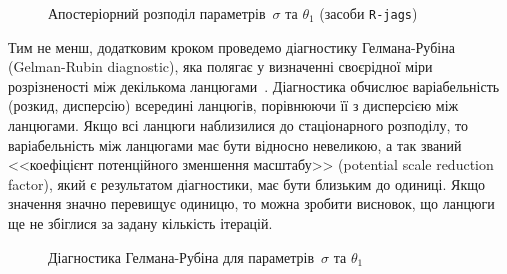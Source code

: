 \vspace{0.4cm}
\begin{figure}[H]\centering
    \caption{Апостеріорний розподіл параметрів~$\sigma$ та $\theta_1$ (засоби \texttt{R-jags})}
    \label{pic: jags Gibbs Sampler traceplot}
\end{figure}

Тим не менш, додатковим кроком проведемо діагностику Гелмана-Рубіна (Gelman-Rubin diagnostic), яка полягає у визначенні своєрідної міри розрізненості між декількома ланцюгами~\cite{McElreath2018}. Діагностика обчислює варіабельність (розкид, дисперсію) всередині ланцюгів, порівнюючи її з дисперсією між ланцюгами. Якщо всі ланцюги наблизилися до стаціонарного розподілу, то варіабельність між ланцюгами має бути відносно невеликою, а так званий <<коефіцієнт потенційного зменшення масштабу>> (potential scale reduction factor), який є результатом діагностики, має бути близьким до одиниці. Якщо значення значно перевищує одиницю, то можна зробити висновок, що ланцюги ще не збіглися за задану кількість ітерацій.

\vspace{0.4cm}
\begin{figure}[H]\centering
    \caption{Діагностика Гелмана-Рубіна для параметрів~$\sigma$ та $\theta_1$}
    \label{pic: jags Gibbs Sampler gelman diagnostic}
\end{figure}


